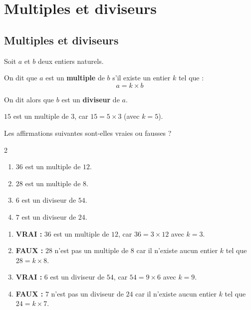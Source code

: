 \chapter{Multiples et diviseurs}

\section{Multiples et diviseurs}

\begin{defin}
	Soit $a$ et $b$ deux entiers naturels.

	On dit que $a$ est un \textbf{multiple} de $b$ s'il existe un entier $k$ tel que :
	\[
		a = k \times b
	\]

	On dit alors que $b$ est un \textbf{diviseur} de $a$.
\end{defin}

\begin{ex}
	$15$ est un multiple de $3$, car $15 = 5 \times 3$ (avec $k = 5$).
\end{ex}

\begin{methode}
	Les affirmations suivantes sont-elles vraies ou fausses ?
	\begin{multicols}{2}
		\begin{enumerate}[label=\alph*)]
			\item $36$ est un multiple de $12$.
			\item $28$ est un multiple de $8$.
			\item $6$ est un diviseur de $54$.
			\item $7$ est un diviseur de $24$.
		\end{enumerate}
	\end{multicols}

	\begin{correction}
		\nline
		\begin{enumerate}[label=\alph*)]
			\item \textbf{VRAI :} $36$ est un multiple de $12$, car $36 = 3 \times 12$ avec $k = 3$.
			\item \textbf{FAUX :} $28$ n'est pas un multiple de $8$ car il n'existe aucun entier $k$ tel que $28 = k \times 8$.
			\item \textbf{VRAI :} $6$ est un diviseur de $54$, car $54 = 9 \times 6$ avec $k = 9$.
			\item \textbf{FAUX :} $7$ n'est pas un diviseur de $24$ car il n'existe aucun entier $k$ tel que $24 = k \times 7$.
		\end{enumerate}
	\end{correction}
\end{methode}

